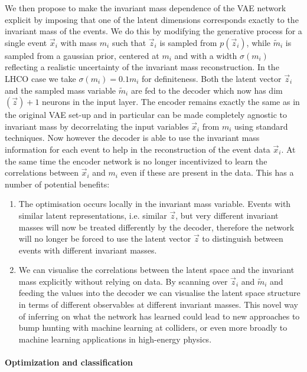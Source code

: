 \documentclass[a4paper,11pt]{article}
\begin{document}
We then propose to make the invariant mass dependence of the VAE network explicit by imposing that one of the latent dimensions corresponds exactly to the invariant mass of the events.
We do this by modifying the generative process for a single event $\vec{x}_i$ with mass $m_i$ such that $\vec{z}_i$ is sampled from $p(\vec{z}_i)$, while $\tilde{m}_i$ is sampled from a gaussian prior, centered at $m_i$ and with a width $\sigma(m_i)$ reflecting a realistic uncertainty of the invariant mass reconstruction. In the LHCO case we take $\sigma(m_i) = 0.1 m_i$ for definiteness.
Both the latent vector $\vec{z}_i$ and the sampled mass variable $\tilde{m}_i$ are fed to the decoder which now has dim$(\vec{z})+1$ neurons in the input layer.
The encoder remains exactly the same as in the original VAE set-up and in particular can be made completely agnostic to invariant mass by decorrelating  the input variables $\vec{x}_i$ from $m_i$ using standard techniques. 
Now however the decoder is able to use the invariant mass information for each event to help in the reconstruction of the event data $\vec{x}_i$. At the same time the encoder network is no longer incentivized to learn the correlations between $\vec{x}_i$ and $m_i$ even if these are present in the data.
This has a number of potential benefits:
\begin{enumerate}
    \item The optimisation occurs locally in the invariant mass variable.
        Events with similar latent representations, i.e. similar $\vec{z}$, but very different invariant masses will now be treated differently by the decoder, therefore the network will no longer be forced to use the latent vector $\vec{z}$ to distinguish between events with different invariant masses.
    \item We can visualise the correlations between the latent space and the invariant mass explicitly without relying on data.
        By scanning over $\vec{z}_i$ and $\tilde{m}_i$ and feeding the values into the decoder we can visualise the latent space structure in terms of different observables at different invariant masses.
        This novel way of inferring on what the network has learned could lead to new approaches to bump hunting with machine learning at colliders, or even more broadly to machine learning applications in high-energy physics.
\end{enumerate}

\paragraph{Optimization and classification}
\end{document}
